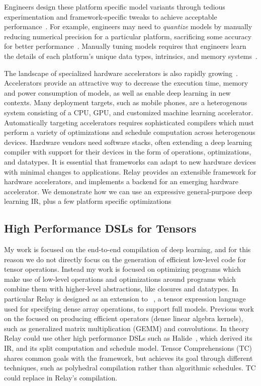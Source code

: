 Engineers design these platform specific model variants
  through tedious experimentation and framework-specific tweaks
  to achieve acceptable performance~\citep{mobilenet}. %
For example,
  engineers may need to \textit{quantize} models
  by manually reducing numerical precision for a particular platform,
  sacrificing some accuracy for better performance~\citep{xnornet}.
Manually tuning models requires
  that engineers learn the details of
  each platform's
  unique data types, intrinsics, and memory systems~\citep{fb_fp_hw, tpuv1, brainwave, nn_on_si}.

The landscape of specialized hardware
  accelerators is also rapidly growing~\citep{
    moreau2018vta, OpenTPU, tpuv1}.
Accelerators provide an attractive way to decrease
  the execution time, memory and power consumption of models, as well
  as enable deep learning in new contexts.
Many deployment targets, such as mobile phones, are a heterogenous system
  consisting of a CPU, GPU, and customized machine learning accelerator.
Automatically targeting accelerators requires sophisticated compilers which
  must perform a variety of optimizations and schedule computation across
  heterogenous devices.
Hardware vendors need software stacks, often extending a deep learning
  compiler with support for their devices in the form of operations,
  optimizations, and datatypes.
It is essential that frameworks can adapt to new hardware devices
  with minimal changes to applications.
Relay provides an extensible framework for hardware accelerators,
  and implements a backend for \vta an emerging hardware accelerator\citep{moreau2018vta}.
We demonstrate how we can use an expressive general-purpose deep learning IR, plus
  a few platform specific optimizations

\subsection{High Performance DSLs for Tensors}

My work is focused on the end-to-end compilation of deep learning, and for
  this reason we do not directly focus on the generation of efficient low-level code for
  tensor operations.
Instead my work is focused on optimizing programs which make use of low-level operations
  and optimizations around programs which combine them with higher-level abstractions,
  like closures and datatypes.
In particular Relay is designed as an extension to \tvm~\citep{tvm_osdi18},
  a tensor expression language used for specifying dense array
  operations, to support full models.
Previous work on the \tvm focused on producing efficient operators
  (dense linear algebra kernels), such as generalized matrix multiplication (GEMM) and convolutions.
In theory Relay could use other high performance DSLs such as Halide~\citep{halide},
    which \tvm derived its IR, and its split computation and schedule model.
Tensor Comprehensions (TC) shares common goals with the \tvm framework, but achieves its goal
through different techniques, such as polyhedral compilation rather than algorithmic
schedules. TC could replace \tvm in Relay{}'s compilation.

